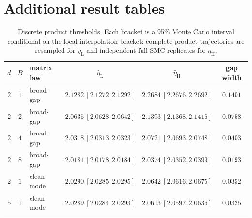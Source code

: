 \documentclass[11pt]{article}
\theoremstyle{definition}
\begin{document}
\section{Additional result tables}

\begin{table}[ht]
\centering
\scriptsize
\begin{tabular}{@{}cclccc@{}}
\toprule
$d$ & $B$ & matrix law & $\widehat\eta_{\mathrm L}$
& $\widehat\eta_{\mathrm H}$ & gap width \\
\midrule
$2$ & $1$ & broad-gap & $2.1282\ [2.1272,2.1292]$ & $2.2684\ [2.2676,2.2692]$ & $0.1401$ \\
$2$ & $2$ & broad-gap & $2.0635\ [2.0628,2.0642]$ & $2.1393\ [2.1368,2.1416]$ & $0.0758$ \\
$2$ & $4$ & broad-gap & $2.0318\ [2.0313,2.0323]$ & $2.0721\ [2.0693,2.0748]$ & $0.0403$ \\
$2$ & $8$ & broad-gap & $2.0181\ [2.0178,2.0184]$ & $2.0374\ [2.0352,2.0399]$ & $0.0193$ \\
$2$ & $1$ & clean-mode & $2.0290\ [2.0285,2.0295]$ & $2.0642\ [2.0616,2.0675]$ & $0.0352$ \\
$5$ & $1$ & clean-mode & $2.0289\ [2.0284,2.0293]$ & $2.0613\ [2.0597,2.0636]$ & $0.0325$ \\
\bottomrule
\end{tabular}
\caption{Discrete product thresholds.  Each bracket is a 95\% Monte Carlo
interval conditional on the local interpolation bracket: complete product
trajectories are resampled for $\eta_{\mathrm L}$ and independent full-SMC
replicates for $\eta_{\mathrm H}$.}
\label{tab:threshold-results}
\end{table}
\end{document}
